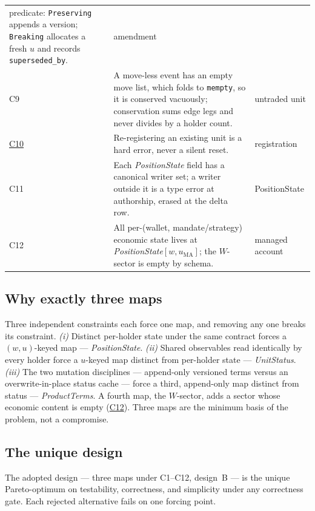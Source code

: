 \begin{longtable}{@{}p{0.8cm} p{11.0cm} p{2.5cm}@{}}
predicate: \texttt{Preserving} appends a version; \texttt{Breaking} allocates a fresh $u$
and records \texttt{superseded\_by}. & amendment \\
\addlinespace
\hypertarget{cond:C9}{C9}\label{cond:C9} & A move-less event has an empty move list, which
folds to \texttt{mempty}, so it is conserved vacuously; conservation sums edge legs and never
divides by a holder count. & untraded unit \\
\addlinespace
\hyperref[cond:C10]{C10} & Re-registering an existing unit is a hard
error, never a silent reset. & registration \\
\addlinespace
\hypertarget{cond:C11}{C11}\label{cond:C11} & Each \emph{PositionState} field has a
canonical writer set; a writer outside it is a type error at authorship, erased at the
delta row. & PositionState \\
\addlinespace
\hypertarget{cond:C12}{C12}\label{cond:C12} & All per-(wallet, mandate/strategy) economic
state lives at \emph{PositionState}$[w,u_{\mathrm{MA}}]$; the $W$-sector is empty by
schema. & managed account \\
\bottomrule
\end{longtable}

\subsection{Why exactly three maps}
\label{sec:sec04-pareto-three}

Three independent constraints each force one map, and removing any one breaks its
constraint. \emph{(i)} Distinct per-holder state under the same contract forces a
$(w,u)$-keyed map --- \emph{PositionState}. \emph{(ii)} Shared observables read identically
by every holder force a $u$-keyed map distinct from per-holder state --- \emph{UnitStatus}.
\emph{(iii)} The two mutation disciplines --- append-only versioned terms versus an
overwrite-in-place status cache --- force a third, append-only map distinct from status ---
\emph{ProductTerms}. A fourth map, the $W$-sector, adds a sector whose economic content is
empty (\hyperref[cond:C12]{C12}). Three maps are the minimum basis of the problem, not a
compromise.

\subsection{The unique design}
\label{sec:sec04-pareto}

The adopted design --- three maps under C1--C12, design~B --- is the unique Pareto-optimum
on testability, correctness, and simplicity under any correctness gate. Each rejected
alternative fails on one forcing point.

